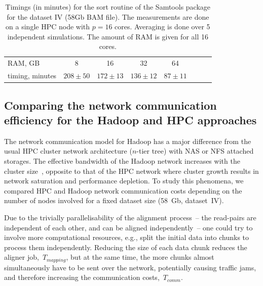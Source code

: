 \documentclass[11pt, oneside]{article}   	%
\begin{document}
 \begin{table}[hbtp]
\small

\caption{Timings (in minutes) for the sort routine of the Samtools package for the dataset IV (58Gb BAM file). The measurements are done on a single HPC node with $p=16$ cores. Averaging is done over 5 independent simulations. The amount of RAM is given for all 16 cores. }
\begin{center}
\begin{tabular}{|l|c|c|c|c|c|c|c|}
RAM, GB		&	8			&		16			&			32		& 		64				\\
timing, minutes	&	$208\pm50$	&	$172\pm13$		&	$136\pm12$		& 	$87\pm11$			\\
\end{tabular}
\end{center}
\label{table:5}
\normalsize
\end{table}%





 \subsection{Comparing the network communication efficiency for the Hadoop and HPC approaches }
The network communication model for Hadoop has a major difference from the usual HPC cluster network architecture ($n$-tier tree) with NAS or NFS attached storages. The effective bandwidth of the Hadoop network increases with the cluster size~\cite{Sammer:2012}, opposite to that of the HPC network where cluster growth results in network saturation and performance depletion.
To study this phenomena, we compared HPC and Hadoop network communication costs depending on the number of nodes involved for a fixed dataset size (58~Gb, dataset~IV).
 
Due to the trivially parallelisability of the alignment process~-- the read-pairs are independent of each other, and can be aligned independently~-- one could try to involve more computational resources, e.g., split the initial data into chunks to process them independently.
Reducing the size of each data chunk reduces the aligner  job,~$T_{mapping}$, but at the same time, the more chunks almost simultaneously have to be sent over the network, potentially causing traffic jams, and therefore increasing the communication costs,~$T_{comm}$.
\end{document}
